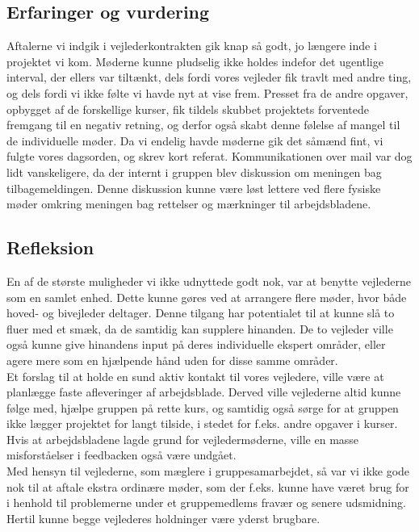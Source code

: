 \documentclass[11pt]{article}
\begin{document}
\subsection{Erfaringer og vurdering}
Aftalerne vi indgik i vejlederkontrakten gik knap så godt, jo længere inde i projektet vi kom. Møderne kunne pludselig ikke holdes indefor det ugentlige interval, der ellers var tiltænkt, dels fordi vores vejleder fik travlt med andre ting, og dels fordi vi ikke følte vi havde nyt at vise frem. Presset fra de andre opgaver, opbygget af de forskellige kurser, fik tildels skubbet projektets forventede fremgang til en negativ retning, og derfor også skabt denne følelse af mangel til de individuelle møder. Da vi endelig havde møderne gik det såmænd fint, vi fulgte vores dagsorden, og skrev kort referat. Kommunikationen over mail var dog lidt vanskeligere, da der internt i gruppen blev diskussion om meningen bag tilbagemeldingen. Denne diskussion kunne være løst lettere ved flere fysiske møder omkring meningen bag rettelser og mærkninger til arbejdsbladene.

\subsection{Refleksion}
En af de største muligheder vi ikke udnyttede godt nok, var at benytte vejlederne som en samlet enhed. Dette kunne gøres ved at arrangere flere møder, hvor både hoved- og bivejleder deltager. Denne tilgang har potentialet til at kunne slå to fluer med et smæk, da de samtidig kan supplere hinanden. De to vejleder ville også kunne give hinandens input på deres individuelle ekspert områder, eller agere mere som en hjælpende hånd uden for disse samme områder.\\
Et forslag til at holde en sund aktiv kontakt til vores vejledere, ville være at planlægge faste afleveringer af arbejdsblade. Derved ville vejlederne altid kunne følge med, hjælpe gruppen på rette kurs, og samtidig også sørge for at gruppen ikke lægger projektet for langt tilside, i stedet for f.eks. andre opgaver i kurser. Hvis at arbejdsbladene lagde grund for vejledermøderne, ville en masse misforståelser i feedbacken også være undgået.\\
Med hensyn til vejlederne, som mæglere i gruppesamarbejdet, så var vi ikke gode nok til at aftale ekstra ordinære møder, som der f.eks. kunne have været brug for i henhold til problemerne under et gruppemedlems fravær og senere udsmidning. Hertil kunne begge vejlederes holdninger være yderst brugbare.
\end{document}
